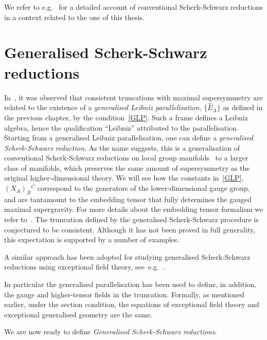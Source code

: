 \documentclass[debug]{phd}
\begin{document}
				We refer to e.g.~\cite{Kaloper:1999yr,Dall'Agata:2005ff,D'Auria:2005er,Hull:2005hk,Hull:2006tp} for a detailed account of conventional Scherk-Schwarz reductions in a context related to the one of this thesis.
			
		\section{Generalised Scherk-Schwarz reductions}\label{genScherkSchw}
				In~\cite{spheres}, it was observed that consistent truncations with maximal supersymmetry are related to the existence of a \emph{generalised Leibniz parallelisation}, $\{\hat{E}_A\}$ as defined in the previous chapter, by the condition~\eqref{GLP}. 
				Such a frame defines a Leibniz algebra, hence the qualification ``Leibniz'' attributed to the parallelisation. 
				Starting from a generalised Leibniz parallelisation, one can define a \emph{generalised Scherk-Schwarz reduction}. 
				As the name suggests, this is a generalisation of conventional Scherk-Schwarz reductions on local group manifolds~\cite{Scherk:1979zr} to a larger class of manifolds, which preserves the same amount of supersymmetry as the original higher-dimensional theory. 
				We will see how the constants in~\eqref{GLP}, $(X_A)_{B}{}^C$ correspond to the generators of the lower-dimensional gauge group, and are tantamount to the embedding tensor that fully determines the gauged maximal supergravity.
				For more details about the embedding tensor formalism we refer to~\cite{henlect}. 
				The truncation defined by the generalised Scherk-Schwarz procedure is conjectured to be consistent. 
				Although it has not been proved in full generality, this expectation is supported by a number of examples.
			
				A similar approach has been adopted for studying generalised Scherk-Schwarz reductions using exceptional field theory, see~e.g.~\cite{samt1,SamtExcReview,Baguet:2015sma,InversoGenSchSchw}.
			
				In particular the generalised parallelisation has been used to define, in addition, the gauge and higher-tensor fields in the truncation. 
				Formally, as mentioned earlier, under the section condition, the equations of exceptional field theory and exceptional generalised geometry are the same.
				
				We are now ready to define \emph{Generalised Scherk-Schwarz reductions}.
				
\end{document}
